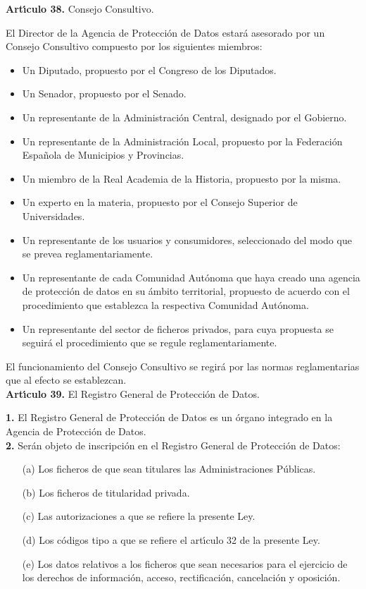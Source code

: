\vspace{0.3cm}
{\large {\bf Art\'{\i}culo 38.} Consejo Consultivo.}

El Director de la Agencia de Protecci\'on de Datos estar\'a asesorado por un 
Consejo Consultivo compuesto por los siguientes miembros:
\begin{itemize}
\item Un Diputado, propuesto por el Congreso de los Diputados.
\item Un Senador, propuesto por el Senado.
\item Un representante de la Administraci\'on Central, designado por el 
Gobierno.
\item Un representante de la Administraci\'on Local, propuesto por la 
Federaci\'on Espa\~nola de Municipios y Provincias.
\item Un miembro de la Real Academia de la Historia, propuesto por la misma.
\item Un experto en la materia, propuesto por el Consejo Superior de 
Universidades.
\item Un representante de los usuarios y consumidores, seleccionado del modo 
que se prevea reglamentariamente.
\item Un representante de cada Comunidad Aut\'onoma que haya creado una agencia 
de protecci\'on de datos en su \'ambito territorial, propuesto de acuerdo con 
el procedimiento que establezca la respectiva Comunidad Aut\'onoma.
\item Un representante del sector de ficheros privados, para cuya propuesta se 
seguir\'a el procedimiento que se regule reglamentariamente.
\end{itemize}
El funcionamiento del Consejo Consultivo se regir\'a por las normas 
reglamentarias que al efecto se establezcan.
\vspace{0.3cm}\\
{\large {\bf Art\'{\i}culo 39.} El Registro General de Protecci\'on de Datos.}

{\bf 1.} El Registro General de Protecci\'on de Datos es un \'organo integrado 
en la Agencia de Protecci\'on de Datos.\\

{\bf 2.} Ser\'an objeto de inscripci\'on en el Registro General de Protecci\'on 
de Datos:
\begin{itemize}
\item [(a)] Los ficheros de que sean titulares las Administraciones P\'ublicas.
\item [(b)] Los ficheros de titularidad privada.
\item [(c)] Las autorizaciones a que se refiere la presente Ley.
\item [(d)] Los c\'odigos tipo a que se refiere el art\'{\i}culo 32 de la 
presente Ley.
\item [(e)] Los datos relativos a los ficheros que sean necesarios para el 
ejercicio de los derechos de informaci\'on, acceso, rectificaci\'on, 
cancelaci\'on y oposici\'on.
\end{itemize}

